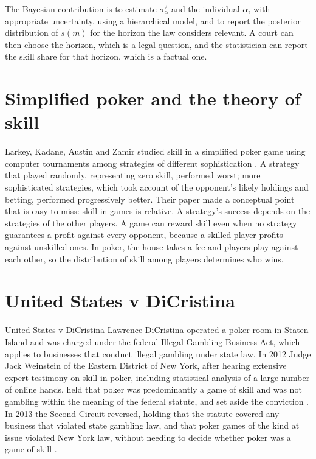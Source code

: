The Bayesian contribution is to estimate $\sigma_\alpha^2$ and the individual $\alpha_i$ with appropriate uncertainty, using a hierarchical model, and to report the posterior distribution of $s(m)$ for the horizon the law considers relevant. A court can then choose the horizon, which is a legal question, and the statistician can report the skill share for that horizon, which is a factual one.

\section{Simplified poker and the theory of skill}

Larkey, Kadane, Austin and Zamir studied skill in a simplified poker game using computer tournaments among strategies of different sophistication \citep{larkey1997}. A strategy that played randomly, representing zero skill, performed worst; more sophisticated strategies, which took account of the opponent's likely holdings and betting, performed progressively better. Their paper made a conceptual point that is easy to miss: skill in games is relative. A strategy's success depends on the strategies of the other players. A game can reward skill even when no strategy guarantees a profit against every opponent, because a skilled player profits against unskilled ones. In poker, the house takes a fee and players play against each other, so the distribution of skill among players determines who wins.

\section{United States v DiCristina}

\begin{casebox}{United States v DiCristina}
Lawrence DiCristina operated a poker room in Staten Island and was charged under the federal Illegal Gambling Business Act, which applies to businesses that conduct illegal gambling under state law. In 2012 Judge Jack Weinstein of the Eastern District of New York, after hearing extensive expert testimony on skill in poker, including statistical analysis of a large number of online hands, held that poker was predominantly a game of skill and was not gambling within the meaning of the federal statute, and set aside the conviction \citep{dicristina2012}. In 2013 the Second Circuit reversed, holding that the statute covered any business that violated state gambling law, and that poker games of the kind at issue violated New York law, without needing to decide whether poker was a game of skill \citep{dicristina2013}.
\end{casebox}

